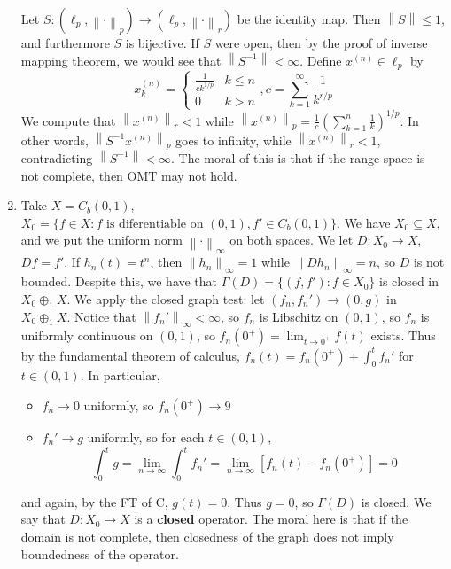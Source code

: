 \documentclass[11pt, a4paper]{memoir}
\newcommand{\norm}[1]{\ensuremath{\left\lVert#1\right\rVert}}
\theoremstyle{change}
\theoremstyle{plain}
\theoremstyle{nonumberplain}
\numberwithin{equation}{section}
\begin{document}
\begin{enumerate}[nl,r]
        Let $S:(\ell_p,\norm{\cdot}_p)\to(\ell_p,\norm{\cdot}_r)$ be the identity map.
        Then $\norm{S}\leq 1$, and furthermore $S$ is bijective.
        If $S$ were open, then by the proof of inverse mapping theorem, we would see that $\norm{S^{-1}}<\infty$.
        Define $x^{(n)}\in\ell_p$ by
        \begin{equation*}
            x_k^{(n)}=
            \begin{cases}
                \frac{1}{ck^{1/p}} & k\leq n\\
                0 & k>n
            \end{cases}
            ,
            c=\sum_{k=1}^\infty\frac{1}{k^{r/p}}
        \end{equation*}
        We compute that $\norm{x^{(n)}}_r<1$ while $\norm{x^{(n)}}_p=\frac{1}{c}\left(\sum_{k=1}^n\frac{1}{k}\right)^{1/p}$.
        In other words, $\norm{S^{-1}x^{(n)}}_p$ goes to infinity, while $\norm{x^{(n)}}_r<1$, contradicting $\norm{S^{-1}}<\infty$.
        The moral of this is that if the range space is not complete, then OMT may not hold.
    \item Take $X=C_b(0,1)$, $X_0=\{f\in X:f\text{ is diferentiable on }(0,1),f'\in C_b(0,1)\}$.
        We have $X_0\subseteq X$, and we put the uniform norm $\norm{\cdot}_\infty$ on both spaces.
        We let $D:X_0\to X$, $Df=f'$.
        If $h_n(t)=t^n$, then $\norm{h_n}_\infty=1$ while $\norm{Dh_n}_\infty=n$, so $D$ is not bounded.
        Despite this, we have that $\Gamma(D)=\{(f,f'):f\in X_0\}$ is closed in $X_0\oplus_1 X$.
        We apply the closed graph test: let $(f_n,f_n')\to (0,g)$ in $X_0\oplus_1 X$.
        Notice that $\norm{f_n'}_\infty<\infty$, so $f_n$ is Libschitz on $(0,1)$, so $f_n$ is uniformly continuous on $(0,1)$, so $f_n(0^+)=\lim_{t\to 0^+}f(t)$ exists.
        Thus by the fundamental theorem of calculus, $f_n(t)=f_n(0^+)+\int_0^t f_n'$ for $t\in(0,1)$.
        In particular,
        \begin{itemize}[nl]
            \item $f_n\to 0$ uniformly, so $f_n(0^+)\to 9$
            \item $f_n'\to g$ uniformly, so for each $t\in(0,1)$,
                \begin{equation*}
                    \int_0^tg=\lim_{n\to\infty}\int_0^tf_n'=\lim_{n\to\infty}[f_n(t)-f_n(0^+)]=0
                \end{equation*}
        \end{itemize}
        and again, by the FT of C, $g(t)=0$.
        Thus $g=0$, so $\Gamma(D)$ is closed.
        We say that $D:X_0\to X$ is a \textbf{closed} operator.
        The moral here is that if the domain is not complete, then closedness of the graph does not imply boundedness of the operator.


\end{enumerate}
\end{document}
